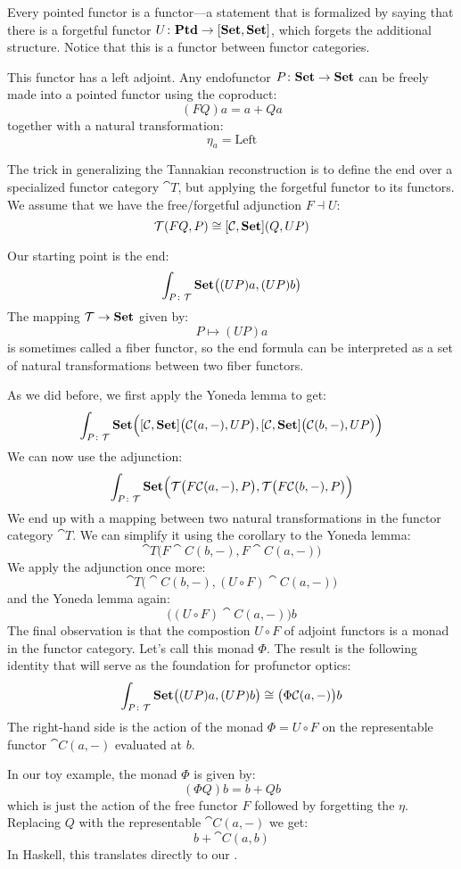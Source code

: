 \documentclass[DaoFP]{subfiles}
\begin{document}
Every pointed functor is a functor---a statement that is formalized by saying that there is a forgetful functor $U \colon\mathbf{Ptd} \to [\mathbf{Set}, \mathbf{Set}]$, which forgets the additional structure. Notice that this is a functor between functor categories. 

This functor has a left adjoint. Any endofunctor $P \colon \mathbf{Set} \to \mathbf{Set}$ can be freely made into a pointed functor using the coproduct:
\[ (F Q) a = a + Q a \]
together with a natural transformation:
\[ \eta_a = \text{Left} \]

The trick in generalizing the Tannakian reconstruction is to define the end over a specialized functor category $\cat T$, 
 but applying the forgetful functor to its functors. We assume that we have the free/forgetful adjunction $F \dashv U$:
\[ \mathcal{T} (F Q, P) \cong  [\mathcal{C}, \mathbf{Set}] ( Q, U P )\]

Our starting point is the end:
\[ \int_{P \colon \mathcal{T}} \mathbf{Set} \big((U P) a, (U P) b\big) \]
The mapping $\mathcal{T} \to \mathbf{Set}$ given by:
\[ P \mapsto (U P) a \]
is sometimes called a fiber functor, so the end formula can be interpreted as a set of natural transformations between two fiber functors. 

As we did before, we first apply the Yoneda lemma to get:
\[ \int_{P \colon \mathcal{T}} \mathbf{Set} \Big([\mathcal{C}, \mathbf{Set}] \big( \mathcal{C} (a ,-), U P\big), [\mathcal{C}, \mathbf{Set}] \big( \mathcal{C} (b ,-), U P\big)\Big) \]
We can now use the adjunction:
\[ \int_{P \colon \mathcal{T}} \mathbf{Set} \Big(\mathcal{T} \big( F \mathcal{C} (a ,-), P\big), \mathcal{T} \big( F \mathcal{C} (b ,-), P\big)\Big) \]
We end up with a mapping between two natural transformations in the functor category $\cat T$. We can simplify it using the corollary to the Yoneda lemma:
\[ \cat T\big( F \cat C (b ,-), F \cat C (a ,-) \big) \]
We apply the adjunction once more:
\[ \cat T\big( \cat C (b ,-), (U\circ F) \cat C (a ,-) \big) \]
and the Yoneda lemma again:
\[ \big( (U\circ F) \cat C (a ,-) \big) b \]
The final observation is that the compostion $U \circ F$ of adjoint functors is a monad in the functor category. Let's call this monad $\Phi$. The result is the following identity that will serve as the foundation for profunctor optics:
\[ \int_{P \colon \mathcal{T}} \mathbf{Set} \big((U P) a, (U P) b\big) \cong \big( \Phi \mathcal{C} (a ,-) \big) b \]
The right-hand side is the action of the monad $\Phi = U \circ F$ on the representable functor $\cat C (a, -)$ evaluated at $b$. 

In our toy example, the monad $\Phi$ is given by:
\[ (\Phi Q) b = b + Q b \]
which is just the action of the free functor $F$ followed by forgetting the $\eta$. Replacing $Q$ with the representable $\cat C (a, -)$ we get:
\[ b + \cat C (a, b) \]
In Haskell, this translates directly to our .
\end{document}
